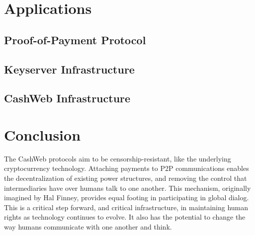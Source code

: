 \documentclass{article}
\begin{document}
\begin{figure}[H]
\centering
{}
\end{figure}

\section{Applications}

\subsection{Proof-of-Payment Protocol}


\subsection{Keyserver Infrastructure}

\subsection{CashWeb Infrastructure}


\section{Conclusion}

The CashWeb protocols aim to be censorship-resistant, like the underlying cryptocurrency technology. Attaching payments to P2P communications enables the decentralization of existing power structures, and removing the control that intermediaries have over humans talk to one another. This mechanism, originally imagined by Hal Finney\cite{finney2004rpow}, provides equal footing in participating in global dialog. This is a critical step forward, and critical infrastructure, in maintaining human rights as technology continues to evolve. It also has the potential to change the way humans communicate with one another and think.

\cite{nakamoto2008bpp}




\end{document}
